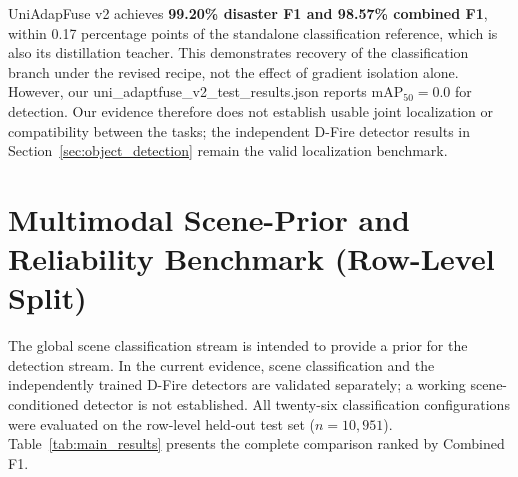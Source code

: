 \begin{table}[H]
\centering
\caption[UniAdapFuse scene-classification recovery]{UniAdapFuse scene-classification recovery ($n=10{,}951$). v2 recovers classification, but its detection $\mathrm{mAP}_{50}$ is 0.0.}
\label{tab:uniadaptfuse_results}
\end{table}

UniAdapFuse v2 achieves \textbf{99.20\% disaster F1 and 98.57\% combined F1}, within 0.17 percentage points of the standalone classification reference, which is also its distillation teacher. This demonstrates recovery of the classification branch under the revised recipe, not the effect of gradient isolation alone. However, our uni\_adaptfuse\_v2\_test\_results.json reports $\mathrm{mAP}_{50}=0.0$ for detection. Our evidence therefore does not establish usable joint localization or compatibility between the tasks; the independent D-Fire detector results in Section~\ref{sec:object_detection} remain the valid localization benchmark.

\section{Multimodal Scene-Prior and Reliability Benchmark (Row-Level Split)}
\label{sec:classification_benchmark}

The global scene classification stream is intended to provide a prior for the detection stream. In the current evidence, scene classification and the independently trained D-Fire detectors are validated separately; a working scene-conditioned detector is not established. All twenty-six classification configurations were evaluated on the row-level held-out test set ($n=10{,}951$). Table~\ref{tab:main_results} presents the complete comparison ranked by Combined F1.

